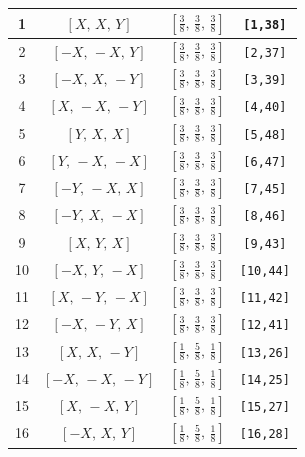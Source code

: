 \documentclass[fleqn,8pt]{jsarticle}
\begin{document}
\begin{longtable}{cccc}
1 & $\left[ X,\, X,\, Y \right]$ & $\left[ \frac{3}{8},\, \frac{3}{8},\, \frac{3}{8} \right]$ & {\tt [1,38]} \\ \hline
2 & $\left[ - X,\, - X,\, Y \right]$ & $\left[ \frac{3}{8},\, \frac{3}{8},\, \frac{3}{8} \right]$ & {\tt [2,37]} \\ \hline
3 & $\left[ - X,\, X,\, - Y \right]$ & $\left[ \frac{3}{8},\, \frac{3}{8},\, \frac{3}{8} \right]$ & {\tt [3,39]} \\ \hline
4 & $\left[ X,\, - X,\, - Y \right]$ & $\left[ \frac{3}{8},\, \frac{3}{8},\, \frac{3}{8} \right]$ & {\tt [4,40]} \\ \hline
5 & $\left[ Y,\, X,\, X \right]$ & $\left[ \frac{3}{8},\, \frac{3}{8},\, \frac{3}{8} \right]$ & {\tt [5,48]} \\ \hline
6 & $\left[ Y,\, - X,\, - X \right]$ & $\left[ \frac{3}{8},\, \frac{3}{8},\, \frac{3}{8} \right]$ & {\tt [6,47]} \\ \hline
7 & $\left[ - Y,\, - X,\, X \right]$ & $\left[ \frac{3}{8},\, \frac{3}{8},\, \frac{3}{8} \right]$ & {\tt [7,45]} \\ \hline
8 & $\left[ - Y,\, X,\, - X \right]$ & $\left[ \frac{3}{8},\, \frac{3}{8},\, \frac{3}{8} \right]$ & {\tt [8,46]} \\ \hline
9 & $\left[ X,\, Y,\, X \right]$ & $\left[ \frac{3}{8},\, \frac{3}{8},\, \frac{3}{8} \right]$ & {\tt [9,43]} \\ \hline
10 & $\left[ - X,\, Y,\, - X \right]$ & $\left[ \frac{3}{8},\, \frac{3}{8},\, \frac{3}{8} \right]$ & {\tt [10,44]} \\ \hline
11 & $\left[ X,\, - Y,\, - X \right]$ & $\left[ \frac{3}{8},\, \frac{3}{8},\, \frac{3}{8} \right]$ & {\tt [11,42]} \\ \hline
12 & $\left[ - X,\, - Y,\, X \right]$ & $\left[ \frac{3}{8},\, \frac{3}{8},\, \frac{3}{8} \right]$ & {\tt [12,41]} \\ \hline
13 & $\left[ X,\, X,\, - Y \right]$ & $\left[ \frac{1}{8},\, \frac{5}{8},\, \frac{1}{8} \right]$ & {\tt [13,26]} \\ \hline
14 & $\left[ - X,\, - X,\, - Y \right]$ & $\left[ \frac{1}{8},\, \frac{5}{8},\, \frac{1}{8} \right]$ & {\tt [14,25]} \\ \hline
15 & $\left[ X,\, - X,\, Y \right]$ & $\left[ \frac{1}{8},\, \frac{5}{8},\, \frac{1}{8} \right]$ & {\tt [15,27]} \\ \hline
16 & $\left[ - X,\, X,\, Y \right]$ & $\left[ \frac{1}{8},\, \frac{5}{8},\, \frac{1}{8} \right]$ & {\tt [16,28]} \\ \hline

\end{longtable}
\end{document}
